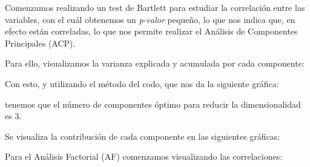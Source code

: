 \documentclass[11pt,a4paper]{article}
\begin{document}
Comenzamos realizando un test de Bartlett para estudiar la correlación entre las variables, con el cuál obtenemos un \emph{p-valor} pequeño, lo que nos indica que, en efecto están correladas, lo que nos permite realizar el Análisis de Componentes Principales (ACP).

Para ello, visualizamos la varianza explicada y acumulada por cada componente:
\begin{figure}[H]
\centering
{}
\end{figure}

Con esto, y utilizando el método del codo, que nos da la siguiente gráfica:
\begin{figure}[H]
\centering
{}
\end{figure}
tenemos que el número de componentes óptimo para reducir la dimensionalidad es 3.

Se visualiza la contribución de cada componente en las siguientes gráficas:
\begin{figure}[H]
\centering
{}
\end{figure}

\begin{figure}[H]
\centering
{}
\end{figure}

\begin{figure}[H]
\centering
{}
\end{figure}

Para el Análisis Factorial (AF) comenzamos visualizando las correlaciones:
\begin{figure}[H]
\centering
{}
\end{figure}
\end{document}

